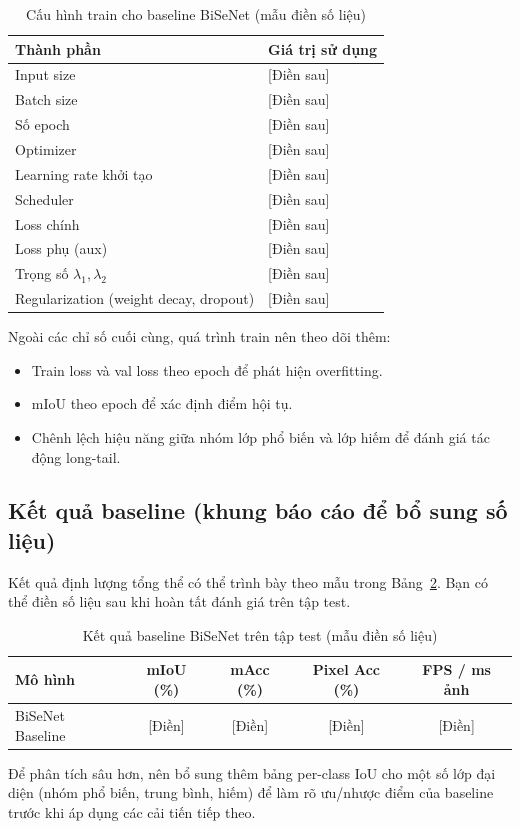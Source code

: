 \begin{table}[H]
    \centering
    \caption{Cấu hình train cho baseline BiSeNet (mẫu điền số liệu)}
    \label{tab:bisenet-baseline-config}
    \begin{tabular}{ll}
        \toprule
        Thành phần & Giá trị sử dụng \\
        \midrule
        Input size & [Điền sau] \\
        Batch size & [Điền sau] \\
        Số epoch & [Điền sau] \\
        Optimizer & [Điền sau] \\
        Learning rate khởi tạo & [Điền sau] \\
        Scheduler & [Điền sau] \\
        Loss chính & [Điền sau] \\
        Loss phụ (aux) & [Điền sau] \\
        Trọng số $\lambda_1, \lambda_2$ & [Điền sau] \\
        Regularization (weight decay, dropout) & [Điền sau] \\
        \bottomrule
    \end{tabular}
\end{table}

Ngoài các chỉ số cuối cùng, quá trình train nên theo dõi thêm:
\begin{itemize}[leftmargin=1.5em]
    \item Train loss và val loss theo epoch để phát hiện overfitting.
    \item mIoU theo epoch để xác định điểm hội tụ.
    \item Chênh lệch hiệu năng giữa nhóm lớp phổ biến và lớp hiếm để đánh giá tác động long-tail.
\end{itemize}

\subsection{Kết quả baseline (khung báo cáo để bổ sung số liệu)}
Kết quả định lượng tổng thể có thể trình bày theo mẫu trong Bảng~\ref{tab:bisenet-baseline-results}. Bạn có thể điền số liệu sau khi hoàn tất đánh giá trên tập test.

\begin{table}[H]
    \centering
    \caption{Kết quả baseline BiSeNet trên tập test (mẫu điền số liệu)}
    \label{tab:bisenet-baseline-results}
    \begin{tabular}{lcccc}
        \toprule
        Mô hình & mIoU (\%) & mAcc (\%) & Pixel Acc (\%) & FPS / ms ảnh \\
        \midrule
        BiSeNet Baseline & [Điền] & [Điền] & [Điền] & [Điền] \\
        \bottomrule
    \end{tabular}
\end{table}

Để phân tích sâu hơn, nên bổ sung thêm bảng per-class IoU cho một số lớp đại diện (nhóm phổ biến, trung bình, hiếm) để làm rõ ưu/nhược điểm của baseline trước khi áp dụng các cải tiến tiếp theo.
